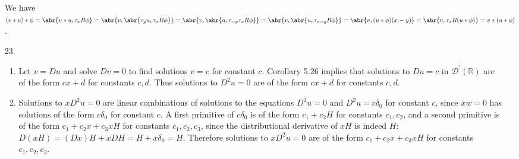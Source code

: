 \documentclass[11pt,leqno]{article}
\theoremstyle{plain}
\theoremstyle{definition}
\numberwithin{equation}{section}
\numberwithin{lem}{section}
\begin{document}
\begin{enumerate}
    We have $(v\ast u)\ast \phi = \abr{v\ast u,\tau_xR\phi} = \abr{v,\abr{\tau_yu,\tau_xR\phi}} = \abr{v,\abr{u,\tau_{-y}\tau_xR\phi}} = \abr{v,\abr{u,\tau_{x-y}R\phi}} = \abr{v,(u\ast\phi)(x-y)} = \abr{v,\tau_xR(u\ast\phi)} = v\ast(u\ast \phi)$.
    \item[23.] \begin{enumerate}
      \item Let $v = Du$ and solve $Dv = 0$ to find solutions $v = c$ for constant $c$. Corollary 5.26 implies that solutions to $Du = c$ in $\mathcal D^\prime(\mathbb R)$ are of the form $cx+d$ for constants $c,d$. Thus solutions to $D^2u = 0$ are of the form $cx+d$ for constants $c,d$.
      \item Solutions to $xD^2u = 0$ are linear combinations of solutions to the equations $D^2u = 0$ and $D^2u = c\delta_0$ for constant $c$, since $xw = 0$ has solutions of the form $c\delta_0$ for constant $c$. A first primitive of $c\delta_0$ is of the form $c_1 + c_2H$ for constants $c_1,c_2$, and a second primitive is of the form $c_1 + c_2x + c_3xH$ for constants $c_1,c_2,c_3$, since the distributional derivative of $xH$ is indeed $H$: $D(xH) = (Dx)H + xDH = H + x\delta_0 = H$. Therefore solutions to $xD^2u = 0$ are of the form $c_1+c_2x+c_3xH$ for constants $c_1,c_2,c_3$.
    \end{enumerate}
\end{enumerate}
\end{document}
